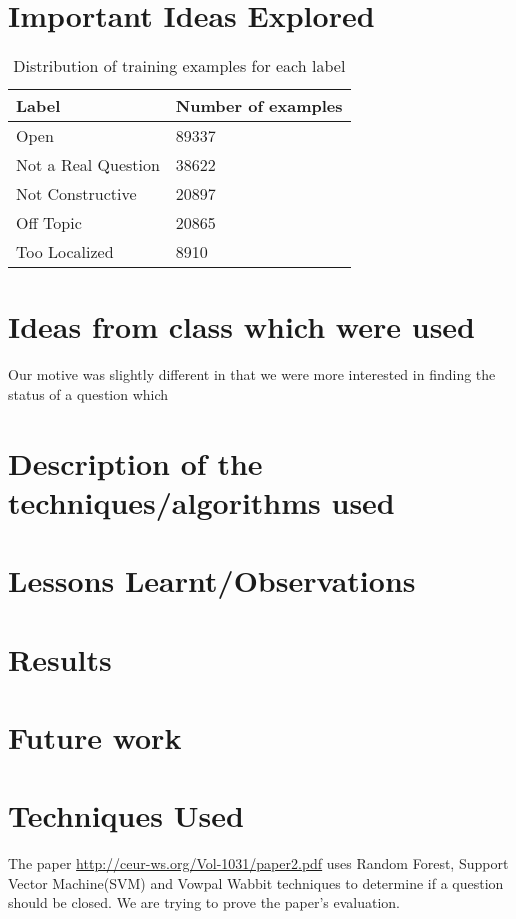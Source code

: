 \documentclass[11pt]{exam}
\begin{document}
\section{Important Ideas Explored}

\begin{table*}
	\begin{tabular}{ |p{4cm}|p{4cm} |}
		\hline
		\textbf {Label} & \textbf{Number of examples}\\ \hline
		Open		&	89337\\  \hline
		Not a Real Question	&	38622 \\  \hline
		Not Constructive	&	20897 \\  \hline
		Off Topic		&	20865\\  \hline
		Too Localized		&	8910\\  \hline
		
	\end{tabular}
	\caption{Distribution of training examples for each label} 
	\label{tab:cctop10} 
\end{table*} 

\section{Ideas from class which were used}

Our motive was slightly different in that we were more interested in finding the status of a question which 

\section{Description of the techniques/algorithms used}

\section{Lessons Learnt/Observations}

\section{Results }
\section{Future work}


\section{Techniques Used}

The paper \url{http://ceur-ws.org/Vol-1031/paper2.pdf} uses Random Forest, Support Vector Machine(SVM) and Vowpal Wabbit techniques to determine if a question should be closed. We are trying to prove the paper's evaluation.
\end{document}
